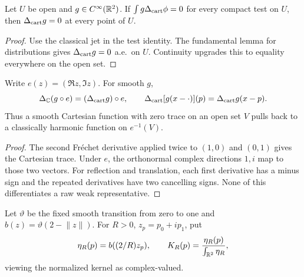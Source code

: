 \begin{lemma}
\label{lem:classical-laplacian-from-tests}
\leanok
Let $U$ be open and $g\in C^\infty(\mathbb{R}^2)$.
If $\int g\Delta_{\rm cart}\phi=0$ for every compact test on $U$,
then $\Delta_{\rm cart}g=0$ at every point of $U$.
\end{lemma}

\begin{proof}
\leanok
Use the classical jet in the test identity. The fundamental lemma for
distributions gives $\Delta_{\rm cart}g=0$ a.e.\ on $U$.
Continuity upgrades this to equality everywhere on the open set.
\end{proof}

\begin{lemma}
\label{lem:cartesian-complex-laplacian}
\leanok
Write $e(z)=(\Re z,\Im z)$. For smooth $g$,
\[
 \Delta_{\mathbb{C}}(g\circ e)=(\Delta_{\rm cart}g)\circ e,\qquad
 \Delta_{\rm cart}[g(x-\cdot)](p)=\Delta_{\rm cart}g(x-p).
\]
Thus a smooth Cartesian function with zero trace on an open set $V$
pulls back to a classically harmonic function on $e^{-1}(V)$.
\end{lemma}

\begin{proof}
\leanok
The second Fr\'echet derivative applied twice to $(1,0)$ and $(0,1)$
gives the Cartesian trace. Under $e$, the orthonormal complex directions
$1,i$ map to those two vectors. For reflection and translation,
each first derivative has a minus sign and the repeated derivatives have
two cancelling signs. None of this differentiates a raw weak representative.
\end{proof}

\begin{definition}
\label{def:radial-plane-mean-kernel}
\leanok
Let $\vartheta$ be the fixed smooth transition from zero to one and
$b(z)=\vartheta(2-\lVert z\rVert)$.
For $R>0$, $z_p=p_0+ip_1$, put
\[
 \eta_R(p)=b((2/R)z_p),\qquad
 K_R(p)=\frac{\eta_R(p)}{\int_{\mathbb{R}^2}\eta_R},
\]
viewing the normalized kernel as complex-valued.
\end{definition}

